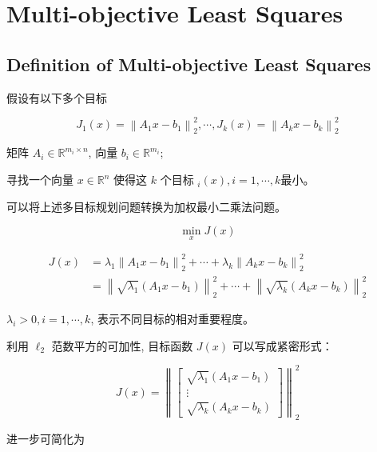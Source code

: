 \chapter{Multi-objective Least Squares}

\section{Definition of Multi-objective Least Squares}

\begin{problem}
    假设有以下多个目标

$$
J_{1}(x)=\left\|A_{1} x-b_{1}\right\|_{2}^{2}, \cdots, J_{k}(x)=\left\|A_{k} x-b_{k}\right\|_{2}^{2}
$$

矩阵 $ A_{i} \in \mathbb{R}^{m_{i} \times n} $, 向量 $ b_{i} \in \mathbb{R}^{m_{i}} $;

寻找一个向量 $ x \in \mathbb{R}^{n} $ 使得这 $ k $ 个目标 $ _{i}(x), i=1, \cdots, k $最小。
\end{problem}

可以将上述多目标规划问题转换为加权最小二乘法问题。

\begin{problem}[加权最小二乘法问题]
    $$ 
    \min _{x} J(x)
$$

$$\begin{aligned}
    J(x)&=\lambda_{1}\left\|A_{1} x-b_{1}\right\|_{2}^{2}+\cdots+\lambda_{k}\left\|A_{k} x-b_{k}\right\|_{2}^{2} \\
    &=\left\|\sqrt{\lambda_{1}}\left(A_{1} x-b_{1}\right)\right\|_{2}^{2}+\cdots+\left\|\sqrt{\lambda_{k}}\left(A_{k} x-b_{k}\right)\right\|_{2}^{2}
    \end{aligned}$$

$ \lambda_{i}>0, i=1, \cdots, k $, 表示不同目标的相对重要程度。
\end{problem}

利用 $ \ell_{2} $ 范数平方的可加性, 目标函数 $ J(x) $ 可以写成紧密形式：

\begin{problem}[加权最小二乘法问题紧密形式]
    $$
J(x)=\left\|\left[\begin{array}{c}
\sqrt{\lambda_{1}}\left(A_{1} x-b_{1}\right) \\
\vdots \\
\sqrt{\lambda_{k}}\left(A_{k} x-b_{k}\right)
\end{array}\right]\right\|_{2}^{2}
$$
\end{problem}


进一步可简化为

